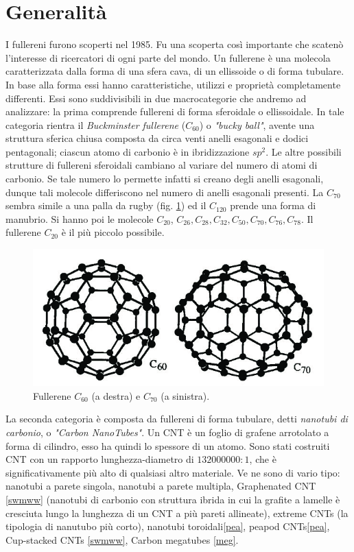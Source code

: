 \documentclass[a4paper,titlepage]{book}
\begin{document}
\section{Generalità}
I fullereni furono scoperti nel 1985. Fu una scoperta così importante che scatenò l'interesse di ricercatori di ogni parte del mondo.
Un fullerene è una molecola caratterizzata dalla forma di una sfera cava, di un ellissoide o di forma tubulare. In base alla forma essi hanno caratteristiche, utilizzi e proprietà completamente differenti. Essi sono suddivisibili in due macrocategorie che andremo ad analizzare: la prima comprende fullereni di forma sferoidale o ellissoidale. In tale categoria rientra il \textit{Buckminster fullerene} ($C_{60}$) o \textit{"bucky ball"}, avente una struttura sferica chiusa composta da circa venti anelli esagonali e dodici pentagonali; ciascun atomo di carbonio è in ibridizzazione $sp^2$. Le altre possibili strutture di fullereni sferoidali cambiano al variare del numero di atomi di carbonio. Se tale numero lo permette infatti si creano degli anelli esagonali, dunque tali molecole differiscono nel numero di anelli esagonali presenti. La $C_{70}$ sembra simile a una palla da rugby (fig. \ref{c60}) ed il $C_{120}$ prende una forma di manubrio. Si hanno poi le molecole $C_{20}$, $C_{26}, C_{28}, C_{32}, C_{50}, C_{70}, C_{76}, C_{78}$. Il fullerene $C_{20}$ è il più piccolo possibile.\\
\begin{figure}[h!] 
	\centering
	\includegraphics[width=0.6\columnwidth]{aaaaaa.png}
	\caption{ 	\label{c60}
		Fullerene $C_{60}$ (a destra) e $C_{70}$ (a sinistra).
	}
\end{figure}
La seconda categoria è composta da fullereni di forma tubulare, detti \textit{nanotubi di carbonio}, o \textit{"Carbon NanoTubes"}. Un CNT è un foglio di grafene arrotolato a forma di cilindro, esso ha quindi lo spessore di un atomo. Sono stati costruiti CNT con un rapporto lunghezza-diametro di $132000000:1$, che è significativamente più alto di qualsiasi altro materiale. Ve ne sono di vario tipo: nanotubi a parete singola, nanotubi a parete multipla, Graphenated CNT \ref{swmww} (nanotubi di carbonio con struttura ibrida in cui la grafite a lamelle è cresciuta lungo la lunghezza di un CNT a più pareti allineate), extreme CNTs (la tipologia di nanutubo più corto), nanotubi toroidali\ref{pea}, peapod CNTs\ref{pea}, Cup-stacked CNTs \ref{swmww}, Carbon megatubes \ref{meg}.
\end{document}
